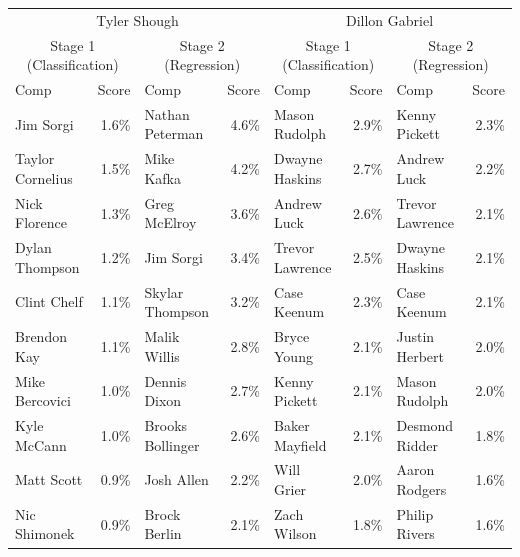 \begin{tabular}{lr|lr|lr|lr}
\multicolumn{4}{c|}{Tyler Shough} & \multicolumn{4}{c}{Dillon Gabriel}\\
\multicolumn{2}{c}{Stage 1 (Classification)} & \multicolumn{2}{c|}{Stage 2 (Regression)} & \multicolumn{2}{c}{Stage 1 (Classification)} & \multicolumn{2}{c}{Stage 2 (Regression)}\\
Comp & Score & Comp & Score & Comp & Score & Comp & Score \\
  \hline
Jim Sorgi & 1.6\% & Nathan Peterman & 4.6\% & Mason Rudolph & 2.9\% & Kenny Pickett & 2.3\% \\ 
  Taylor Cornelius & 1.5\% & Mike Kafka & 4.2\% & Dwayne Haskins & 2.7\% & Andrew Luck & 2.2\% \\ 
  Nick Florence & 1.3\% & Greg McElroy & 3.6\% & Andrew Luck & 2.6\% & Trevor Lawrence & 2.1\% \\ 
  Dylan Thompson & 1.2\% & Jim Sorgi & 3.4\% & Trevor Lawrence & 2.5\% & Dwayne Haskins & 2.1\% \\ 
  Clint Chelf & 1.1\% & Skylar Thompson & 3.2\% & Case Keenum & 2.3\% & Case Keenum & 2.1\% \\ 
  Brendon Kay & 1.1\% & Malik Willis & 2.8\% & Bryce Young & 2.1\% & Justin Herbert & 2.0\% \\ 
  Mike Bercovici & 1.0\% & Dennis Dixon & 2.7\% & Kenny Pickett & 2.1\% & Mason Rudolph & 2.0\% \\ 
  Kyle McCann & 1.0\% & Brooks Bollinger & 2.6\% & Baker Mayfield & 2.1\% & Desmond Ridder & 1.8\% \\ 
  Matt Scott & 0.9\% & Josh Allen & 2.2\% & Will Grier & 2.0\% & Aaron Rodgers & 1.6\% \\ 
  Nic Shimonek & 0.9\% & Brock Berlin & 2.1\% & Zach Wilson & 1.8\% & Philip Rivers & 1.6\% \\ 
\end{tabular}
